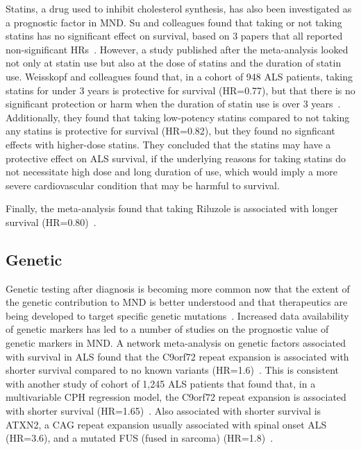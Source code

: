 Statins, a drug used to inhibit cholesterol synthesis, has also been investigated as a prognostic factor in MND.
Su and colleagues found that taking or not taking statins has no significant effect on survival, based on 3 papers that all reported non-significant HRs~\cite{suPredictorsSurvivalPatients2021}.
However, a study published after the meta-analysis looked not only at statin use but also at the dose of statins and the duration of statin use.
Weisskopf and colleagues found that, in a cohort of 948 ALS patients, taking statins for under 3 years is protective for survival (HR=0.77), but that there is no significant protection or harm when the duration of statin use is over 3 years~\cite{weisskopfStatinMedicationsAmyotrophic2022}.
Additionally, they found that taking low-potency statins compared to not taking any statins is protective for survival (HR=0.82), but they found no signficant effects with higher-dose statins.
They concluded that the statins may have a protective effect on ALS survival, if the underlying reasons for taking statins do not necessitate high dose and long duration of use, which would imply a more severe cardiovascular condition that may be harmful to survival.

Finally, the meta-analysis found that taking Riluzole is associated with longer survival (HR=0.80)~\cite{suPredictorsSurvivalPatients2021}.

\subsection{Genetic}

Genetic testing after diagnosis is becoming more common now that the extent of the genetic contribution to MND is better understood and that therapeutics are being developed to target specific genetic mutations~\cite{efnstaskforceondiagnosisandmanagementofamyotrophiclateralsclerosis:EFNSGuidelinesClinical2012}.
Increased data availability of genetic markers has led to a number of studies on the prognostic value of genetic markers in MND.
A network meta-analysis on genetic factors associated with survival in ALS found that the C9orf72 repeat expansion is associated with shorter survival compared to no known variants (HR=1.6)~\cite{suGeneticFactorsSurvival2022}.
This is consistent with another study of cohort of 1,245 ALS patients that found that, in a multivariable CPH regression model, the C9orf72 repeat expansion is associated with shorter survival (HR=1.65)~\cite{chioAssociationCopresencePathogenic2023}.
Also associated with shorter survival is ATXN2, a CAG repeat expansion usually associated with spinal onset ALS (HR=3.6), and a mutated FUS (fused in sarcoma) (HR=1.8)~\cite{suGeneticFactorsSurvival2022}.

